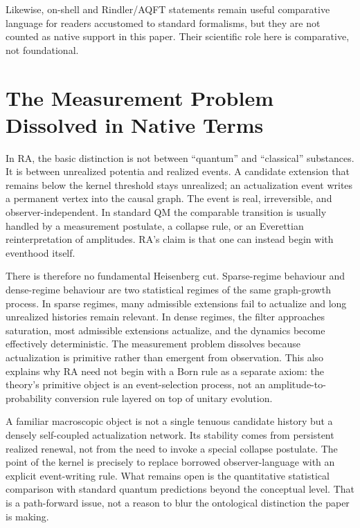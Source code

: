 \documentclass[11pt]{article}
\begin{document}
Likewise, on-shell and Rindler/AQFT statements remain useful comparative language for readers accustomed to standard formalisms, but they are not counted as native support in this paper. Their scientific role here is comparative, not foundational.

\section{The Measurement Problem Dissolved in Native Terms}
\label{sec:measurement}

In RA, the basic distinction is not between ``quantum'' and ``classical'' substances. It is between unrealized potentia and realized events. A candidate extension that remains below the kernel threshold stays unrealized; an actualization event writes a permanent vertex into the causal graph. The event is real, irreversible, and observer-independent. In standard QM the comparable transition is usually handled by a measurement postulate, a collapse rule, or an Everettian reinterpretation of amplitudes. RA's claim is that one can instead begin with eventhood itself.

There is therefore no fundamental Heisenberg cut. Sparse-regime behaviour and dense-regime behaviour are two statistical regimes of the same graph-growth process. In sparse regimes, many admissible extensions fail to actualize and long unrealized histories remain relevant. In dense regimes, the filter approaches saturation, most admissible extensions actualize, and the dynamics become effectively deterministic. The measurement problem dissolves because actualization is primitive rather than emergent from observation. This also explains why RA need not begin with a Born rule as a separate axiom: the theory's primitive object is an event-selection process, not an amplitude-to-probability conversion rule layered on top of unitary evolution.

A familiar macroscopic object is not a single tenuous candidate history but a densely self-coupled actualization network. Its stability comes from persistent realized renewal, not from the need to invoke a special collapse postulate. The point of the kernel is precisely to replace borrowed observer-language with an explicit event-writing rule. What remains open is the quantitative statistical comparison with standard quantum predictions beyond the conceptual level. That is a path-forward issue, not a reason to blur the ontological distinction the paper is making.
\end{document}
